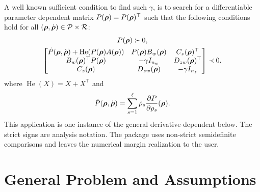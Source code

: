 A well known sufficient condition to find such $\gamma$, is to search for a differentiable parameter dependent matrix $P(\boldsymbol{\rho})=P(\boldsymbol{\rho})^\top$ such that the following conditions hold for all $(\boldsymbol{\rho},\dot{\boldsymbol{\rho}})\in\mathcal P\times\mathcal R$\cite{scherer1996}:
\begin{gather}
    P(\boldsymbol{\rho}) \succ0,
    \label{eq:canonical-positive}\\
    \begin{bmatrix}
        \dot P(\boldsymbol{\rho},\dot{\boldsymbol{\rho}})+\operatorname{He}\!\left(P(\boldsymbol{\rho})A(\boldsymbol{\rho})\right) &
        P(\boldsymbol{\rho})B_w(\boldsymbol{\rho})                                                                             &
        C_z(\boldsymbol{\rho})^\top                                                                                        \\
        B_w(\boldsymbol{\rho})^\top P(\boldsymbol{\rho})                                                                       &
        -\gamma I_{n_w}                                                                                                    &
        D_{zw}(\boldsymbol{\rho})^\top                                                                                         \\
        C_z(\boldsymbol{\rho})                                                                                               &
        D_{zw}(\boldsymbol{\rho})                                                                                            &
        -\gamma I_{n_z}
    \end{bmatrix} \prec0.
    \label{eq:lpv-spine}
\end{gather}
where $\operatorname{He}(X)=X+X^\top$ and
\begin{gather*}
    \dot P(\boldsymbol{\rho},\dot{\boldsymbol{\rho}})
    =\sum_{s=1}^{\ell}\dot\rho_s
    \frac{\partial P}{\partial\rho_s}(\boldsymbol{\rho}).
\end{gather*}
This application is one instance of the general derivative-dependent  below. The strict signs are analysis notation. The package uses non-strict semidefinite comparisons and leaves the numerical margin realization to the user.

\section{General Problem and Assumptions}
\label{sec:general-problem-assumptions}

